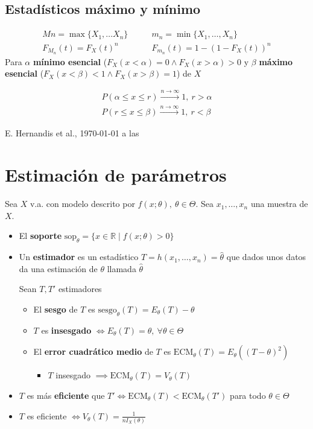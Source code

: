 \documentclass[a4paper,twocolumn]{extarticle}
\theoremstyle{remark}
\newcommand{\R}{\mathbb{R}}
\begin{document}
\subsection{Estadísticos máximo y mínimo}

\begin{align*}
	Mn = \max\{X_1, \dots X_n\} &\qquad m_n = \min \{X_1, \dots, X_n\} \\
	F_{M_n}(t) = F_X(t)^n &\qquad F_{m_n}(t) = 1 - (1 - F_X(t))^n
\end{align*}
Para $\alpha$ \textbf{mínimo esencial} ($F_X(x < \alpha) = 0 \land F_X(x > \alpha) > 0$ y $\beta$ \textbf{máximo esencial} ($F_X(x < \beta) < 1 \land F_X(x > \beta) = 1$)  de $X$

\begin{align*}
P(\alpha \leq x \leq r) \xrightarrow{n \to \infty} 1,\ r > \alpha \\
P(r \leq x \leq \beta) \xrightarrow{n \to \infty} 1,\ r < \beta
\end{align*}
\begin{flushright}
	E. Hernandis et al., \today $ $ a las \currenttime
\end{flushright}

\section{Estimación de parámetros}

Sea $X$ v.a. con modelo descrito por $f(x; \theta),\ \theta \in \Theta$. Sea $x_1, \dots, x_n$ una muestra de $X$.

\begin{itemize}
	\item El \textbf{soporte} $\text{sop}_\theta = \{x \in \R \mid f(x; \theta) > 0\}$
	\item Un \textbf{estimador} es un estadístico $T = h(x_1, \dots, x_n) = \widehat{\theta}$ que dados unos datos da una estimación de $\theta$ llamada $\widehat{\theta}$
	
	Sean $T, T'$ estimadores
	\begin{itemize}
		\item El \textbf{sesgo} de $T$ es $\text{sesgo}_\theta (T) = E_\theta(T) - \theta$
		\item $T$ es \textbf{insesgado} $\iff E_\theta(T) = \theta,\ \forall \theta \in \Theta$
		\item El \textbf{error cuadrático medio} de $T$ es $\text{ECM}_\theta(T) = E_\theta((T - \theta)^2)$
		\begin{itemize}
			\item $T$ insesgado $\implies \text{ECM}_\theta(T) = V_\theta(T)$
		\end{itemize}
	\end{itemize}
	\item $T$ es más \textbf{eficiente} que $T' \iff \text{ECM}_\theta(T) < \text{ECM}_\theta(T')$ para todo $\theta \in \Theta$
	\item $T$ es eficiente $\iff V_\theta(T) = \frac{1}{nI_X(\theta)}$
\end{itemize}
\end{document}
